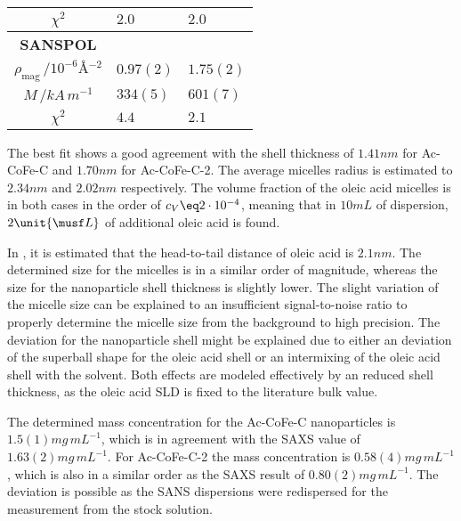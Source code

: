 \documentclass[\main/dresen_thesis.tex]{subfiles}
\begin{document}
\begin{table}[!htbp]
\begin{tabular}{ c | l | l }
        \hline
        \rule{0pt}{2ex} $\chi^2$                                                     & $2.0$          & $2.0$      \\
        \hline
        \textbf{SANSPOL}\\
        \hline
        \rule{0pt}{2ex} $\rho_\mathrm{mag} \, / \unit{10^{-6} \angstrom^{-2}}$       & $0.97(2)$      & $1.75(2)$  \\
        \rule{0pt}{2ex} $M \, / \unit{kA \,m^{-1}}$                                  & $334(5)$       & $601(7)$   \\
        \hline
        \rule{0pt}{2ex} $\chi^2$                                                     & $4.4$          & $2.1$      \\
      \end{tabular}
    \end{table}

    The best fit shows a good agreement with the shell thickness of $1.41 \unit{nm}$ for Ac-CoFe-C and $1.70 \unit{nm}$ for Ac-CoFe-C-2.
    The average micelles radius is estimated to $2.34 \unit{nm}$ and $2.02 \unit{nm}$ respectively.
    The volume fraction of the oleic acid micelles is in both cases in the order of $c_V \eq 2 \cdot 10^{-4}$, meaning that in $10 \unit{mL}$ of dispersion, $2 \unit{\musf L}$ of additional oleic acid is found.

    In \cite{Disch_2010_Thesp}, it is estimated that the head-to-tail distance of oleic acid is $2.1 \unit{nm}$.
    The determined size for the micelles is in a similar order of magnitude, whereas the size for the nanoparticle shell thickness is slightly lower.
    The slight variation of the micelle size can be explained to an insufficient signal-to-noise ratio to properly determine the micelle size from the background to high precision.
    The deviation for the nanoparticle shell might be explained due to either an deviation of the superball shape for the oleic acid shell or an intermixing of the oleic acid shell with the solvent.
    Both effects are modeled effectively by an reduced shell thickness, as the oleic acid SLD is fixed to the literature bulk value.

    The determined mass concentration for the Ac-CoFe-C nanoparticles is $1.5(1) \unit{mg\, mL^{-1}}$, which is in agreement with the SAXS value of $1.63(2) \unit{mg\, mL^{-1}}$.
    For Ac-CoFe-C-2 the mass concentration is $0.58(4) \unit{mg\, mL^{-1}}$, which is also in a similar order as the SAXS result of $0.80(2) \unit{mg \, mL^{-1}}$.
    The deviation is possible as the SANS dispersions were redispersed for the measurement from the stock solution.
\end{document}
